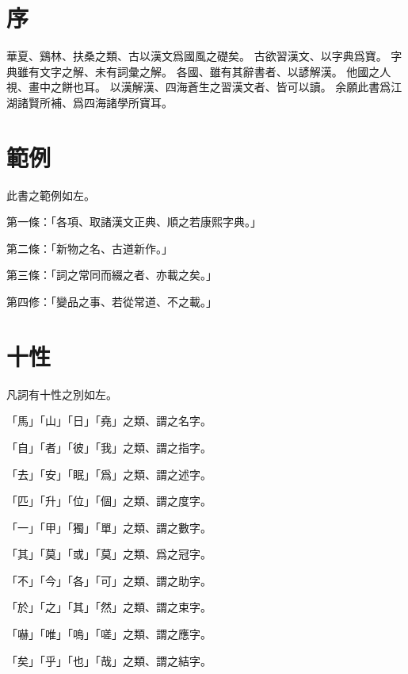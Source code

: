 \section{序}
華夏、鷄林、扶桑之類、古以漢文爲國風之礎矣。
古欲習漢文、以字典爲寶。
字典雖有文字之解、未有詞彙之解。
各國、雖有其辭書者、以諺解漢。
他國之人視、畫中之餅也耳。
以漢解漢、四海蒼生之習漢文者、皆可以讀。
余願此書爲江湖諸賢所補、爲四海諸學所寶耳。
\section{範例}
此書之範例如左。
\par 第一條：「各項、取諸漢文正典、順之若康熙字典。」
\par 第二條：「新物之名、古道新作。」
\par 第三條：「詞之常同而綴之者、亦載之矣。」
\par 第四修：「變品之事、若從常道、不之載。」
\section{十性}
\par 凡詞有十性之別如左。
\par 「馬」「山」「日」「堯」之類、謂之名字。
\par 「自」「者」「彼」「我」之類、謂之指字。
\par 「去」「安」「眠」「爲」之類、謂之述字。
\par 「匹」「升」「位」「個」之類、謂之度字。
\par 「一」「甲」「獨」「單」之類、謂之數字。
\par 「其」「莫」「或」「莫」之類、爲之冠字。
\par 「不」「今」「各」「可」之類、謂之助字。
\par 「於」「之」「其」「然」之類、謂之束字。
\par 「嚇」「唯」「嗚」「嗟」之類、謂之應字。
\par 「矣」「乎」「也」「哉」之類、謂之結字。
